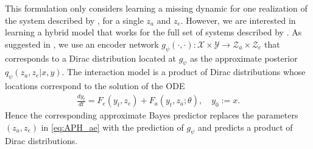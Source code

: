 This formulation only considers learning a missing dynamic for one realization of the system described by , for a single $z_a$ and $z_e$. However, we are interested in learning a hybrid model that works for the full set of systems described by . As suggested in \citet{APHYNITY}, we use an encoder network $g_\psi(\cdot, \cdot): \mathcal{X} \times \mathcal{Y} \rightarrow \mathcal{Z}_a \times \mathcal{Z}_e$ that corresponds to a Dirac distribution located at $g_\psi$ as the approximate posterior $q_\psi(z_a, z_e|x, y)$. The interaction model is a product of Dirac distributions whose locations correspond to the solution of the ODE
\begin{align}
    \frac{dy_t}{dt} = F_e(y_t, z_e) + F_a(y_t, z_a; \theta), \quad y_0:=x.
    \label{eq:APH_ae}
\end{align}
Hence the corresponding approximate Bayes predictor replaces the parameters $(z_a, z_e)$ in \eqref{eq:APH_ae} with the prediction of $g_\psi$ and predicts a product of Dirac distributions.

